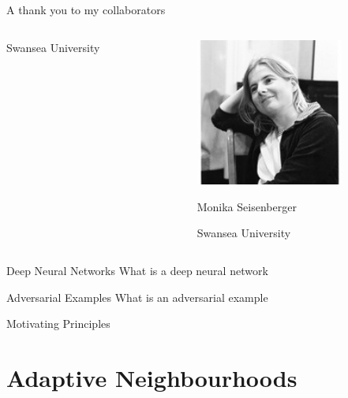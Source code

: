 \documentclass[smaller]{beamer}
\begin{document}
\begin{frame}[label={sec:orgb5bc604}]{A thank you to my collaborators}
\begin{columns}
\begin{column}{0.3\columnwidth}
\begin{center}
Swansea University
\end{center}
\end{column}
\begin{column}{0.3\columnwidth}
\begin{center}
\includegraphics[width=0.7\textwidth]{images/Monika-Seisenberger.jpg}
\end{center}
\begin{center}
Monika Seisenberger

Swansea University
\end{center}
\end{column}
\end{columns}
\end{frame}

\begin{frame}[label={sec:org14e9ece}]{Deep Neural Networks}
What is a deep neural network
\end{frame}

\begin{frame}[label={sec:org07ba311}]{Adversarial Examples}
What is an adversarial example
\end{frame}

\begin{frame}[label={sec:orgb3624b2}]{Motivating Principles}
\end{frame}

\section{Adaptive Neighbourhoods}
\label{sec:org1b5341f}
\end{document}
